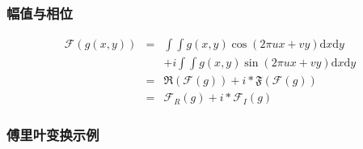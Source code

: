 \documentclass{beamer}
\newcommand{\mathd}{\mathrm{d}}
\newcommand{\nospace}{}
\begin{document}
{{}{\begin{frame}
  \frametitle{幅值与相位}
  \begin{eqnarray*}
    \mathcal{F} (g (x, y)) & = & \int \int g (x, y) \cos (2 \pi u \nospace x +
    v \nospace y) \mathd x \mathd y\\
    &  & + i \int \int g (x, y) \sin (2 \pi u \nospace x + v \nospace y)
    \mathd x \mathd y\\
    & = & \mathfrak{R} (\mathcal{F} (g)) + i \ast \mathfrak{F} (\mathcal{F}
    (g))\\
    & = & \mathcal{F}_R (g) + i \ast \mathcal{F}_I (g)
  \end{eqnarray*}
\end{frame}}{\begin{frame}
  \frametitle{傅里叶变换示例}
  
  {\hspace{3em}}
\end{frame}}}
\end{document}
